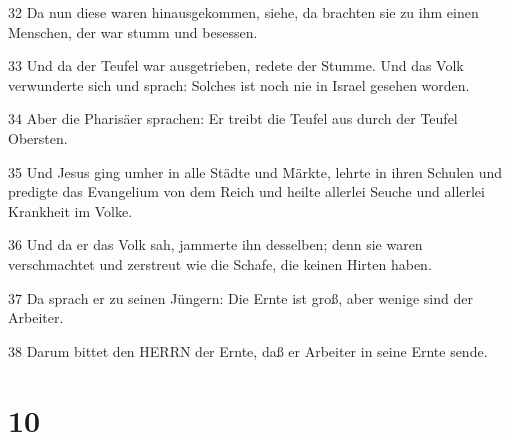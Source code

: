\par 32 Da nun diese waren hinausgekommen, siehe, da brachten sie zu ihm einen Menschen, der war stumm und besessen.
\par 33 Und da der Teufel war ausgetrieben, redete der Stumme. Und das Volk verwunderte sich und sprach: Solches ist noch nie in Israel gesehen worden.
\par 34 Aber die Pharisäer sprachen: Er treibt die Teufel aus durch der Teufel Obersten.
\par 35 Und Jesus ging umher in alle Städte und Märkte, lehrte in ihren Schulen und predigte das Evangelium von dem Reich und heilte allerlei Seuche und allerlei Krankheit im Volke.
\par 36 Und da er das Volk sah, jammerte ihn desselben; denn sie waren verschmachtet und zerstreut wie die Schafe, die keinen Hirten haben.
\par 37 Da sprach er zu seinen Jüngern: Die Ernte ist groß, aber wenige sind der Arbeiter.
\par 38 Darum bittet den HERRN der Ernte, daß er Arbeiter in seine Ernte sende.

\chapter{10}

